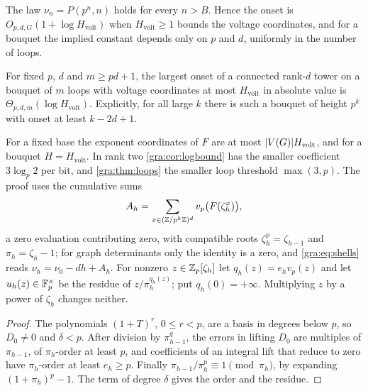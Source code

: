 \begin{theorem}\label{gra:thm:onsetrank}
The law $\nu_n=P(p^n,n)$ holds for every $n>B$. Hence the onset is
$O_{p,d,G}(1+\log H_{\mathrm{volt}})$ when $H_{\mathrm{volt}}\ge1$ bounds the
voltage coordinates, and for a bouquet the implied constant depends only on
$p$ and $d$, uniformly in the number of loops.
\end{theorem}

\begin{theorem}\label{gra:thm:onsetlower}
For fixed $p$, $d$ and $m\ge pd+1$, the largest onset of a connected
rank-$d$ tower on a bouquet of $m$ loops with voltage coordinates at most
$H_{\mathrm{volt}}$ in absolute value is $\Theta_{p,d,m}(\log H_{\mathrm{volt}})$.
Explicitly, for all large $k$ there is such a bouquet of height $p^k$ with
onset at least $k-2d+1$.
\end{theorem}

For a fixed base the exponent coordinates of $F$ are at most
$\lvert V(G)\rvert H_{\mathrm{volt}}$, and for a bouquet $H=H_{\mathrm{volt}}$. In rank
two \cref{gra:cor:logbound} has the smaller coefficient $3\log_p2$ per
bit, and \cref{gra:thm:loops} the smaller loop threshold $\max(3,p)$. The
proof uses the cumulative sums
\[
 A_h=\sum_{x\in(\mathbb{Z}/p^h\mathbb{Z})^d}v_p\bigl(F(\zeta_h^x)\bigr),
\]
a zero evaluation contributing zero, with compatible roots
$\zeta_h^p=\zeta_{h-1}$ and $\pi_h=\zeta_h-1$; for graph determinants only
the identity is a zero, and \eqref{gra:eq:shells} reads
$\nu_h=\nu_0-dh+A_h$. For nonzero $z\in\mathbb{Z}_p[\zeta_h]$ let
$q_h(z)=e_hv_p(z)$ and let $u_h(z)\in\mathbb{F}_p^\times$ be the residue of
$z/\pi_h^{q_h(z)}$; put $q_h(0)=+\infty$. Multiplying $z$ by a power of
$\zeta_h$ changes neither.


\begin{proof}
The polynomials $(1+T)^r$, $0\le r<p$, are a basis in degrees below $p$,
so $D_0\ne0$ and $\delta<p$. After division by $\pi_{h-1}^q$, the errors in
lifting $D_0$ are multiples of $\pi_{h-1}$, of $\pi_h$-order at least $p$,
and coefficients of an integral lift that reduce to zero have $\pi_h$-order
at least $e_h\ge p$. Finally $\pi_{h-1}/\pi_h^p\equiv1\pmod{\pi_h}$, by
expanding $(1+\pi_h)^p-1$. The term of degree $\delta$ gives the order and
the residue.
\end{proof}

